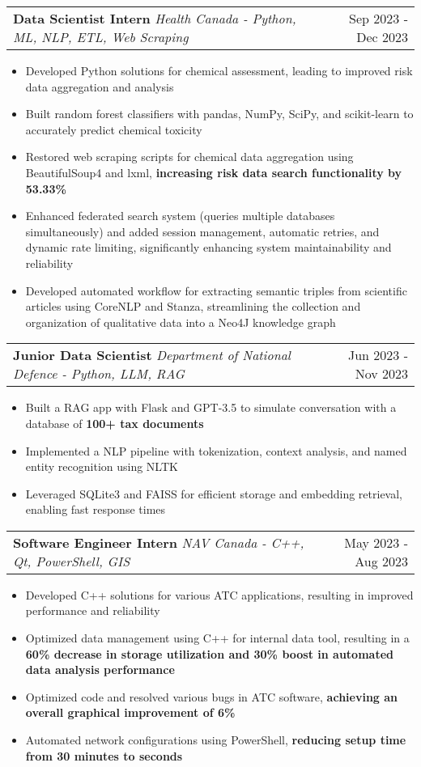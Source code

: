 \documentclass[letterpaper,11pt]{article}
\makeatletter
\newcommand{\resumeItem}[1]{
  \item\small{
    {#1 \vspace{-3pt}}
  }
}
\newcommand{\resumeSubheading}[3]{
    \item
    \begin{tabular*}{0.97\textwidth}[t]{l@{\extracolsep{\fill}}r}
      \textbf{#1} \textbar \textit{ #2} & #3 \\
    \end{tabular*}\vspace{-7.5pt}
}
\newcommand{\resumeItemListStart}{\begin{itemize}}
\newcommand{\resumeItemListEnd}{\end{itemize}\vspace{-5pt}}
\makeatother
\begin{document}
    \resumeSubheading
      {Data Scientist Intern}{Health Canada - Python, ML, NLP, ETL, Web Scraping}{Sep 2023 - Dec 2023}
      \resumeItemListStart
        \resumeItem{Developed Python solutions for chemical assessment, leading to improved risk data aggregation and analysis}
        \resumeItem{Built random forest classifiers with pandas, NumPy, SciPy, and scikit-learn to accurately predict chemical toxicity}
        \resumeItem{Restored web scraping scripts for chemical data aggregation using BeautifulSoup4 and lxml, \textbf{increasing risk data search functionality by 53.33\%}}
        \resumeItem{Enhanced federated search system (queries multiple databases simultaneously) and added session management, automatic retries, and dynamic rate limiting, significantly enhancing system maintainability and reliability}
        \resumeItem{Developed automated workflow for extracting semantic triples from scientific articles using CoreNLP and Stanza, streamlining the collection and organization of qualitative data into a Neo4J knowledge graph}
      \resumeItemListEnd

    \resumeSubheading
    {Junior Data Scientist}{Department of National Defence - Python, LLM, RAG}{Jun 2023 - Nov 2023}
      \resumeItemListStart
        \resumeItem{Built a RAG app with Flask and GPT-3.5 to simulate conversation with a database of \textbf{100+ tax documents}}
        \resumeItem{Implemented a NLP pipeline with tokenization, context analysis, and named entity recognition using NLTK}
        \resumeItem{Leveraged SQLite3 and FAISS for efficient storage and embedding retrieval, enabling fast response times}
      \resumeItemListEnd

    \resumeSubheading
    {Software Engineer Intern}{NAV Canada - C++, Qt, PowerShell, GIS}{May 2023 - Aug 2023}
      \resumeItemListStart
        \resumeItem{Developed C++ solutions for various ATC applications, resulting in improved performance and reliability}
        \resumeItem{Optimized data management using C++ for internal data tool, resulting in a \textbf{60\% decrease in storage utilization and 30\% boost in automated data analysis performance}}
        \resumeItem{Optimized code and resolved various bugs in ATC software, \textbf{achieving an overall graphical improvement of 6\%}}
        \resumeItem{Automated network configurations using PowerShell, \textbf{reducing setup time from 30 minutes to seconds}}
      \resumeItemListEnd

\end{document}
